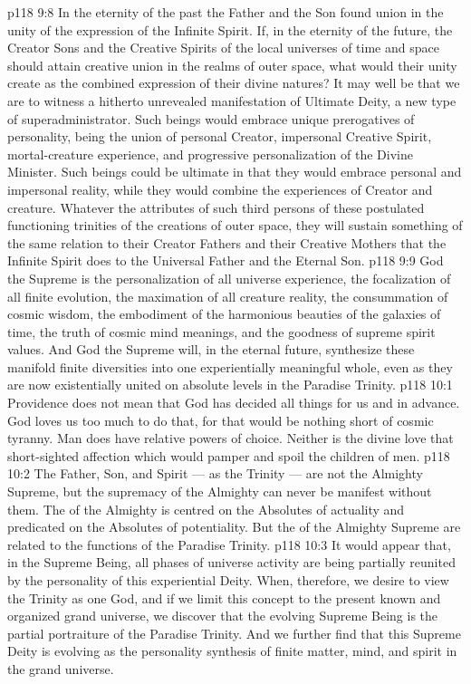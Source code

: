 \vs p118 9:8 In the eternity of the past the Father and the Son found union in the unity of the expression of the Infinite Spirit. If, in the eternity of the future, the Creator Sons and the Creative Spirits of the local universes of time and space should attain creative union in the realms of outer space, what would their unity create as the combined expression of their divine natures? It may well be that we are to witness a hitherto unrevealed manifestation of Ultimate Deity, a new type of superadministrator. Such beings would embrace unique prerogatives of personality, being the union of personal Creator, impersonal Creative Spirit, mortal\hyp{}creature experience, and progressive personalization of the Divine Minister. Such beings could be ultimate in that they would embrace personal and impersonal reality, while they would combine the experiences of Creator and creature. Whatever the attributes of such third persons of these postulated functioning trinities of the creations of outer space, they will sustain something of the same relation to their Creator Fathers and their Creative Mothers that the Infinite Spirit does to the Universal Father and the Eternal Son.
\vs p118 9:9 \pc God the Supreme is the personalization of all universe experience, the focalization of all finite evolution, the maximation of all creature reality, the consummation of cosmic wisdom, the embodiment of the harmonious beauties of the galaxies of time, the truth of cosmic mind meanings, and the goodness of supreme spirit values. And God the Supreme will, in the eternal future, synthesize these manifold finite diversities into one experientially meaningful whole, even as they are now existentially united on absolute levels in the Paradise Trinity.
\vs p118 10:1 Providence does not mean that God has decided all things for us and in advance. God loves us too much to do that, for that would be nothing short of cosmic tyranny. Man does have relative powers of choice. Neither is the divine love that short\hyp{}sighted affection which would pamper and spoil the children of men.
\vs p118 10:2 \pc The Father, Son, and Spirit --- as the Trinity --- are not the Almighty Supreme, but the supremacy of the Almighty can never be manifest without them. The  of the Almighty is centred on the Absolutes of actuality and predicated on the Absolutes of potentiality. But the  of the Almighty Supreme are related to the functions of the Paradise Trinity.
\vs p118 10:3 It would appear that, in the Supreme Being, all phases of universe activity are being partially reunited by the personality of this experiential Deity. When, therefore, we desire to view the Trinity as one God, and if we limit this concept to the present known and organized grand universe, we discover that the evolving Supreme Being is the partial portraiture of the Paradise Trinity. And we further find that this Supreme Deity is evolving as the personality synthesis of finite matter, mind, and spirit in the grand universe.
